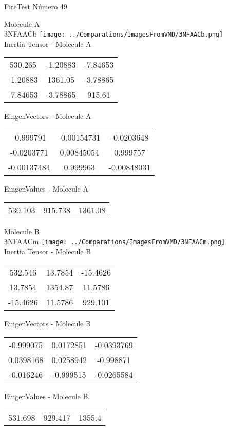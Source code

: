 \vtab[-2cm]
\begin{center}
{\large FireTest \tab Número 49}
\end{center}
\begin{multicols}{2}
\begin{center}

Molecule A \\ 
3NFAACb
\texttt{[image: ../Comparations/ImagesFromVMD/3NFAACb.png]}
\\
Inertia Tensor - Molecule A \\
\vtab

\begin{tabular}{|c c c|}
530.265	 & 	-1.20883	 & 	-7.84653	 \\
-1.20883	 & 	1361.05	 & 	-3.78865	 \\
-7.84653	 & 	-3.78865	 & 	915.61
\end{tabular}

\vtab
 EingenVectors - Molecule A     \\
\vtab
\begin{tabular}{|c c c|}
-0.999791	 & 	-0.00154731	 & 	-0.0203648	 \\
-0.0203771	 & 	0.00845054	 & 	0.999757	 \\
-0.00137484	 & 	0.999963	 & 	-0.00848031
\end{tabular}

\vtab
 EingenValues - Molecule A     \\
\vtab
\begin{tabular}{|c c c|}
530.103	 & 	915.738	 & 	1361.08	 \\
\end{tabular}
\columnbreak

Molecule B \\ 
3NFAACm
\texttt{[image: ../Comparations/ImagesFromVMD/3NFAACm.png]}
\\
Inertia Tensor - Molecule B \\
\vtab

\begin{tabular}{|c c c|}
532.546	 & 	13.7854	 & 	-15.4626	 \\
13.7854	 & 	1354.87	 & 	11.5786	 \\
-15.4626	 & 	11.5786	 & 	929.101
\end{tabular}

\vtab
 EingenVectors - Molecule B     \\
\vtab
\begin{tabular}{|c c c|}
-0.999075	 & 	0.0172851	 & 	-0.0393769	 \\
0.0398168	 & 	0.0258942	 & 	-0.998871	 \\
-0.016246	 & 	-0.999515	 & 	-0.0265584
\end{tabular}

\vtab
 EingenValues - Molecule B     \\
\vtab
\begin{tabular}{|c c c|}
531.698	 & 	929.417	 & 	1355.4	 \\
\end{tabular}

\end{center}
\end{multicols}
